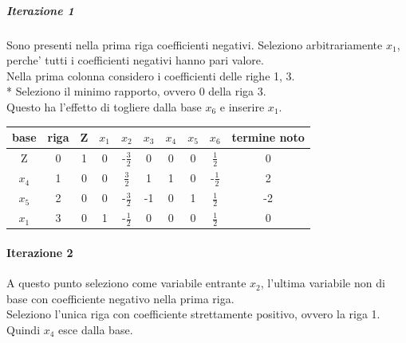 \documentclass[a4paper,12pt,oneside]{article}
\begin{document}
    \subparagraph{Iterazione 1}

    Sono presenti nella prima riga coefficienti negativi. Seleziono arbitrariamente $x_1$, perche' tutti i coefficienti negativi hanno pari valore. \\

    Nella prima colonna considero i coefficienti delle righe 1, 3. \\*
    Seleziono il minimo rapporto, ovvero 0 della riga 3. \\

    Questo ha l'effetto di togliere dalla base $x_6$ e inserire $x_1$.

    \begin{center}
        \begin{tabular}{|c|c|c|c|c|c|c|c|c|c|}
            \hline
            base & riga & Z & $x_1$ & $x_2$ & $x_3$ & $x_4$ & $x_5$ & $x_6$ & termine noto \\
            \hline
            Z & 0 & 1 &  0 & -$\frac 3 2$ &  0 &  0 &  0 &  $\frac 1 2$ &  0 \\
            $x_4$ & 1 & 0 &  0 &  $\frac 3 2$ &  1 &  1 &  0 & -$\frac 1 2$ &  2 \\
            $x_5$ & 2 & 0 &  0 & -$\frac 3 2$ & -1 &  0 &  1 &  $\frac 1 2$ & -2 \\
            $x_1$ & 3 & 0 &  1 & -$\frac 1 2$ &  0 &  0 &  0 &  $\frac 1 2$ &  0 \\
            \hline
        \end{tabular}
    \end{center}

    \paragraph{Iterazione 2}

    A questo punto seleziono come variabile entrante $x_2$, l'ultima variabile non di base con coefficiente negativo nella prima riga. \\

    Seleziono l'unica riga con coefficiente strettamente positivo, ovvero la riga 1. Quindi $x_4$ esce dalla base. \\
\end{document}
